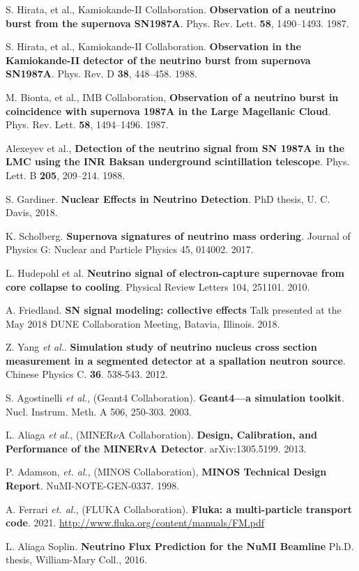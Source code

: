  S. Hirata, et al., Kamiokande-II Collaboration. \textbf{Observation of a neutrino burst from the supernova SN1987A}. Phys. Rev. Lett. \textbf{58}, 1490–1493. 1987.

 S. Hirata, et al., Kamiokande-II Collaboration. \textbf{Observation in the Kamiokande-II detector of the neutrino burst from supernova SN1987A}. Phys. Rev. D \textbf{38}, 448–458. 1988.

 M. Bionta, et al., IMB Collaboration, \textbf{Observation of a neutrino burst in coincidence with supernova 1987A in the Large Magellanic Cloud}. Phys. Rev. Lett. \textbf{58}, 1494–1496. 1987. 

 Alexeyev et al., \textbf{Detection of the neutrino signal from SN 1987A in the LMC using the INR Baksan underground scintillation telescope}. Phys. Lett. B \textbf{205}, 209–214. 1988.

 S. Gardiner. \textbf{Nuclear Effects in Neutrino Detection}. PhD thesis,  U. C. Davis, 2018.

 K. Scholberg. \textbf{Supernova signatures of neutrino mass ordering}. Journal of Physics G: Nuclear and Particle Physics 45, 014002. 2017.

 L. Hudepohl et al. \textbf{Neutrino signal of electron-capture supernovae from core collapse to cooling}. Physical Review Letters 104, 251101. 2010.

 A. Friedland. \textbf{SN signal modeling: collective effects} Talk presented at the May 2018 DUNE Collaboration Meeting, Batavia, Illinois. 2018. 

 Z. Yang \textit{et al.}. \textbf{Simulation study of neutrino nucleus cross section measurement in a segmented detector at a spallation neutron source}. Chinese Physics C. \textbf{36}. 538-543. 2012. 


 S. Agostinelli \textit{et al.}, (Geant4 Collaboration). \textbf{Geant4—a simulation toolkit}. Nucl. Instrum. Meth. A 506, 250-303. 2003.

 L. Aliaga \textit{et al.}, (MINER$\nu$A Collaboration). \textbf{Design, Calibration, and Performance of the MINERvA Detector}.  arXiv:1305.5199. 2013. 

 P. Adamson, \textit{et. al.}, (MINOS Collaboration), \textbf{MINOS Technical Design Report}. NuMI-NOTE-GEN-0337. 1998.

 A. Ferrari \textit{et. al.}, (FLUKA Collaboration). \textbf{Fluka:
a multi-particle transport code}. 2021. \href{http://www.fluka.org/content/manuals/FM.pdf
}{http://www.fluka.org/content/manuals/FM.pdf}

 L. Aliaga Soplin. \textbf{Neutrino Flux Prediction for the NuMI Beamline} Ph.D. thesis, William-Mary Coll., 2016.